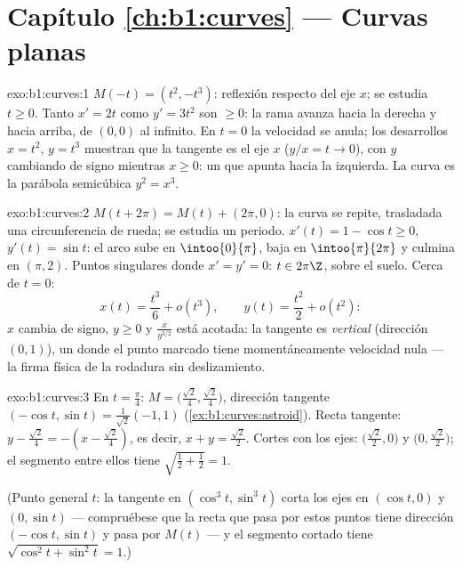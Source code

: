 \section*{Capítulo \ref{ch:b1:curves} --- Curvas planas}

\begin{solution}{exo:b1:curves:1}
$M(-t) = (t^2, -t^3)$: reflexión respecto del eje $x$; se estudia $t \geq 0$.
Tanto $x' = 2t$ como $y' = 3t^2$ son $\geq 0$: la rama avanza
hacia la derecha y hacia arriba, de $(0,0)$ al infinito. En $t = 0$ la velocidad
se anula; los desarrollos $x = t^2$, $y = t^3$ muestran que la tangente es el
eje $x$ ($y/x = t \to 0$), con $y$ cambiando de signo mientras $x \geq 0$:
un \emph{} que apunta hacia la izquierda. La curva es la parábola
semicúbica $y^2 = x^3$.
\end{solution}

\begin{solution}{exo:b1:curves:2}
$M(t + 2\pi) = M(t) + (2\pi, 0)$: la curva se repite, trasladada
una circunferencia de rueda; se estudia un periodo. $x'(t) = 1 - \cos t \geq
0$, $y'(t) = \sin t$: el arco sube en $\intoo{0}{\pi}$, baja en
$\intoo{\pi}{2\pi}$ y culmina en $(\pi, 2)$. Puntos singulares
donde $x' = y' = 0$: $t \in 2\pi\Z$, sobre el suelo. Cerca de $t = 0$:
\[
x(t) = \frac{t^3}{6} + o(t^3),
\qquad
y(t) = \frac{t^2}{2} + o(t^2):
\]
$x$ cambia de signo, $y \geq 0$ y $\frac{x}{y^{3/2}}$ está acotada: la
tangente es \emph{vertical} (dirección $(0,1)$), un  donde el
punto marcado tiene momentáneamente velocidad nula --- la firma física
de la rodadura sin deslizamiento.
\end{solution}

\begin{solution}{exo:b1:curves:3}
En $t = \frac\pi4$: $M = \bigl(\frac{\sqrt2}{4},
\frac{\sqrt2}{4}\bigr)$, dirección tangente $(-\cos t, \sin t) =
\frac{1}{\sqrt2}(-1, 1)$ (\cref{ex:b1:curves:astroid}). Recta
tangente: $y - \frac{\sqrt2}{4} = -(x - \frac{\sqrt2}{4})$, es decir, $x +
y = \frac{\sqrt2}{2}$. Cortes con los ejes: $\bigl(\frac{\sqrt2}{2},
0\bigr)$ y $\bigl(0, \frac{\sqrt2}{2}\bigr)$; el segmento entre
ellos tiene  $\sqrt{\frac12 + \frac12} = 1$.

(Punto general $t$: la tangente en $(\cos^3 t, \sin^3 t)$ corta los
ejes en $(\cos t, 0)$ y $(0, \sin t)$ --- compruébese que la recta
que pasa por estos puntos tiene dirección $(-\cos t, \sin t)$ y pasa
por $M(t)$ --- y el segmento cortado tiene  $\sqrt{\cos^2 t +
\sin^2 t} = 1$.)
\end{solution}


